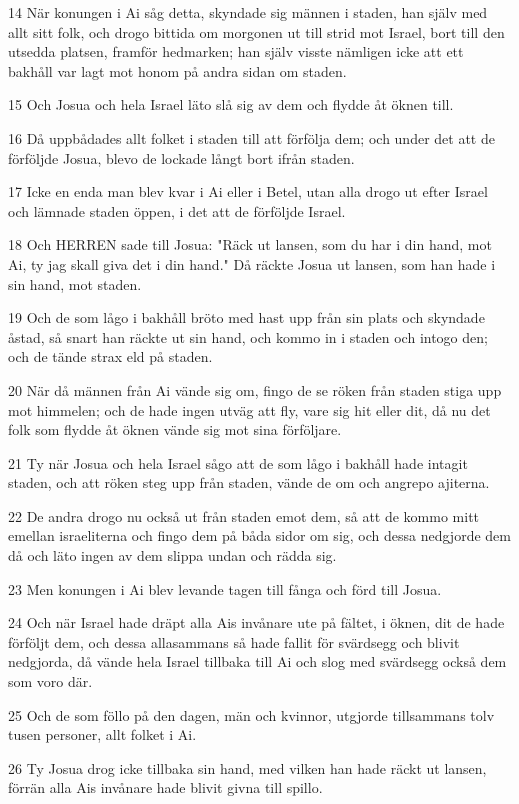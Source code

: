 \par 14 När konungen i Ai såg detta, skyndade sig männen i staden, han själv med allt sitt folk, och drogo bittida om morgonen ut till strid mot Israel, bort till den utsedda platsen, framför hedmarken; han själv visste nämligen icke att ett bakhåll var lagt mot honom på andra sidan om staden.
\par 15 Och Josua och hela Israel läto slå sig av dem och flydde åt öknen till.
\par 16 Då uppbådades allt folket i staden till att förfölja dem; och under det att de förföljde Josua, blevo de lockade långt bort ifrån staden.
\par 17 Icke en enda man blev kvar i Ai eller i Betel, utan alla drogo ut efter Israel och lämnade staden öppen, i det att de förföljde Israel.
\par 18 Och HERREN sade till Josua: "Räck ut lansen, som du har i din hand, mot Ai, ty jag skall giva det i din hand." Då räckte Josua ut lansen, som han hade i sin hand, mot staden.
\par 19 Och de som lågo i bakhåll bröto med hast upp från sin plats och skyndade åstad, så snart han räckte ut sin hand, och kommo in i staden och intogo den; och de tände strax eld på staden.
\par 20 När då männen från Ai vände sig om, fingo de se röken från staden stiga upp mot himmelen; och de hade ingen utväg att fly, vare sig hit eller dit, då nu det folk som flydde åt öknen vände sig mot sina förföljare.
\par 21 Ty när Josua och hela Israel sågo att de som lågo i bakhåll hade intagit staden, och att röken steg upp från staden, vände de om och angrepo ajiterna.
\par 22 De andra drogo nu också ut från staden emot dem, så att de kommo mitt emellan israeliterna och fingo dem på båda sidor om sig, och dessa nedgjorde dem då och läto ingen av dem slippa undan och rädda sig.
\par 23 Men konungen i Ai blev levande tagen till fånga och förd till Josua.
\par 24 Och när Israel hade dräpt alla Ais invånare ute på fältet, i öknen, dit de hade förföljt dem, och dessa allasammans så hade fallit för svärdsegg och blivit nedgjorda, då vände hela Israel tillbaka till Ai och slog med svärdsegg också dem som voro där.
\par 25 Och de som föllo på den dagen, män och kvinnor, utgjorde tillsammans tolv tusen personer, allt folket i Ai.
\par 26 Ty Josua drog icke tillbaka sin hand, med vilken han hade räckt ut lansen, förrän alla Ais invånare hade blivit givna till spillo.
